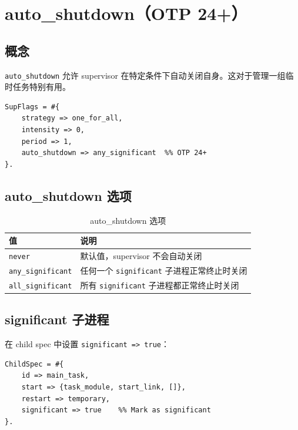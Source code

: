 \documentclass[a4paper,11pt]{article}
\begin{document}
\section{auto\_shutdown（OTP 24+）}

\subsection{概念}

\texttt{auto\_shutdown} 允许 supervisor 在特定条件下自动关闭自身。这对于管理一组临时任务特别有用。

\begin{lstlisting}[style=erlangstyle]
SupFlags = #{
    strategy => one_for_all,
    intensity => 0,
    period => 1,
    auto_shutdown => any_significant  %% OTP 24+
}.
\end{lstlisting}

\subsection{auto\_shutdown 选项}

\begin{table}[H]
\centering
\begin{tabular}{@{}ll@{}}
\toprule
\textbf{值} & \textbf{说明} \\
\midrule
\texttt{never} & 默认值，supervisor 不会自动关闭 \\
\texttt{any\_significant} & 任何一个 \texttt{significant} 子进程正常终止时关闭 \\
\texttt{all\_significant} & 所有 \texttt{significant} 子进程都正常终止时关闭 \\
\bottomrule
\end{tabular}
\caption{auto\_shutdown 选项}
\end{table}

\subsection{significant 子进程}

在 child spec 中设置 \texttt{significant => true}：

\begin{lstlisting}[style=erlangstyle]
ChildSpec = #{
    id => main_task,
    start => {task_module, start_link, []},
    restart => temporary,
    significant => true    %% Mark as significant
}.
\end{lstlisting}
\end{document}
